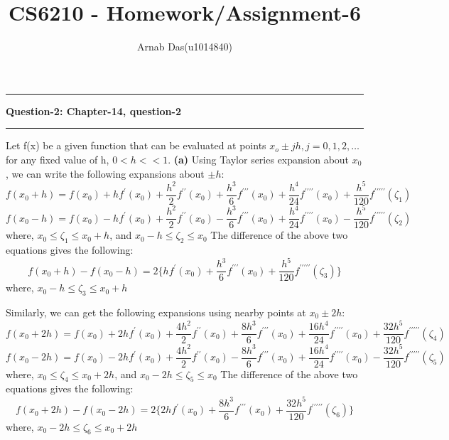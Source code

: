 \documentclass{article}
\title{CS6210 - Homework/Assignment-6}
\author{Arnab Das(u1014840)}
\newcommand\question[2]{\vspace{.25in}\hrule\textbf{#1: #2}\hrule\vspace{.10in}}
\renewcommand\part[1]{\vspace{.10in}\textbf{(#1)}}
\begin{document}
  \maketitle
  \newpage
  \newcommand\NAME{ARNAB DAS}
  \newcommand\UID{uxxxxxxx}
  \newcommand\HWNUM{4}

  \question{Question-2}{Chapter-14, question-2}
  Let f(x) be a given function that can be evaluated at points $x_o \pm jh, j=0,1,2,\dots$ for any fixed value of h, $0 < h << 1$. \newline
  \part{a} Using Taylor series expansion about $x_0$, we can write the following expansions about $\pm h$:
  \[ f(x_0 + h) = f(x_0) + hf^\prime(x_0) + \dfrac{h^2}{2}f^{\prime\prime}(x_0) + \dfrac{h^3}{6}f^{\prime\prime\prime}(x_0) + \dfrac{h^4}{24}f^{\prime\prime\prime\prime}(x_0) + \dfrac{h^5}{120}f^{\prime\prime\prime\prime\prime}(\zeta_1) \]
  \[ f(x_0 - h) = f(x_0) - hf^\prime(x_0) + \dfrac{h^2}{2}f^{\prime\prime}(x_0) - \dfrac{h^3}{6}f^{\prime\prime\prime}(x_0) + \dfrac{h^4}{24}f^{\prime\prime\prime\prime}(x_0) - \dfrac{h^5}{120}f^{\prime\prime\prime\prime\prime}(\zeta_2) \]
  where, $x_0 \leq \zeta_1 \leq x_0 + h$, and $x_0 - h \leq \zeta_2 \leq x_0$
  The difference of the above two equations gives the following:
  \begin{equation}
  f(x_0+h) - f(x_0-h) = 2\{ hf^\prime(x_0) + \dfrac{h^3}{6}f^{\prime\prime\prime}(x_0) + \dfrac{h^5}{120}f^{\prime\prime\prime\prime\prime}(\zeta_3) \}
  \label{eq:1ptdiff}
  \end{equation}
  where, $x_0 - h \leq \zeta_3 \leq x_0 + h$

  Similarly, we can get the following expansions using nearby points at $x_0 \pm 2h$:
  \[ f(x_0 + 2h) = f(x_0) + 2hf^\prime(x_0) + \dfrac{4h^2}{2}f^{\prime\prime}(x_0) + \dfrac{8h^3}{6}f^{\prime\prime\prime}(x_0) + \dfrac{16h^4}{24}f^{\prime\prime\prime\prime}(x_0) + \dfrac{32h^5}{120}f^{\prime\prime\prime\prime\prime}(\zeta_4) \]
  \[ f(x_0 - 2h) = f(x_0) - 2hf^\prime(x_0) + \dfrac{4h^2}{2}f^{\prime\prime}(x_0) - \dfrac{8h^3}{6}f^{\prime\prime\prime}(x_0) + \dfrac{16h^4}{24}f^{\prime\prime\prime\prime}(x_0) - \dfrac{32h^5}{120}f^{\prime\prime\prime\prime\prime}(\zeta_5) \]
  where, $x_0 \leq \zeta_4 \leq x_0 + 2h$, and $x_0 - 2h \leq \zeta_5 \leq x_0$
  The difference of the above two equations gives the following:
  \begin{equation}
  f(x_0+2h) - f(x_0-2h) = 2\{ 2hf^\prime(x_0) + \dfrac{8h^3}{6}f^{\prime\prime\prime}(x_0) + \dfrac{32h^5}{120}f^{\prime\prime\prime\prime\prime}(\zeta_6) \}
  \label{eq:2ptdiff}
  \end{equation}
  where, $x_0 - 2h \leq \zeta_6 \leq x_0 + 2h$
\end{document}
